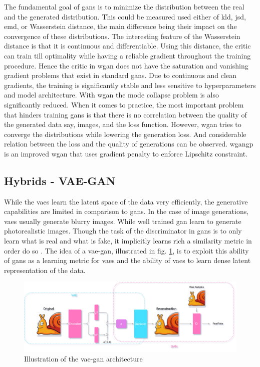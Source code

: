The fundamental goal of \acp{gan} is to minimize the distribution between the real and the generated distribution. This could be measured used either of \ac{kld}, \ac{jsd}, \ac{emd}, or Wasserstein distance, the main difference being their impact on the convergence of these distributions. The interesting feature of the Wasserstein distance is that it is continuous and differentiable. Using this distance, the critic can train till optimality while having a reliable gradient throughout the training procedure. Hence the critic in \ac{wgan} does not have the saturation and vanishing gradient problems that exist in standard \acp{gan}. Due to continuous and clean gradients, the training is significantly stable and less sensitive to hyperparameters and model architecture. With \ac{wgan} the mode collapse problem is also significantly reduced. When it comes to practice, the most important problem that hinders training \acp{gan} is that there is no correlation between the quality of the generated data say, images, and the loss function. However, \ac{wgan} tries to converge the distributions while lowering the generation loss. And considerable relation between the loss and the quality of generations can be observed. \ac{wgangp} \cite{wgangp} is an improved \ac{wgan} that uses gradient penalty to enforce Lipschitz constraint.

\subsection{Hybrids - VAE-GAN}
\label{subsec:vaeganhybrid}
While the \acp{vae} learn the latent space of the data very efficiently, the generative capabilities are limited in comparison to \acp{gan}. In the case of image generations, \acp{vae} usually generate blurry images. While well trained \ac{gan} learn to generate photorealistic images. Though the task of the discriminator in \acp{gan} is to only learn what is real and what is fake, it implicitly learns rich a similarity metric in order do so \cite{autoencoding_beyond_pixels}. The idea of a \ac{vae}-\ac{gan}, illustrated in fig. \ref{fig:vae_gan_arch}, is to exploit this ability of \acp{gan} as a learning metric for \acp{vae} and the ability of \acp{vae} to learn dense latent representation of the data.

\begin{figure}[h]
    \centering
    \includegraphics[width=\textwidth]{figures/arch/vae_gan_arch.png}
    \caption{Illustration of the \ac{vae}-\ac{gan} architecture}
    \label{fig:vae_gan_arch}
\end{figure}

